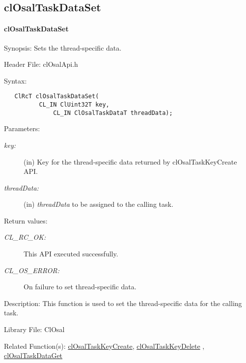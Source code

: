 \subsection{clOsalTaskDataSet}
\hypertarget{pageosal125}{}\paragraph{cl\-Osal\-Task\-Data\-Set}\label{pageosal125}
\begin{Desc}
\item[Synopsis:]Sets the thread-specific data.\end{Desc}
\begin{Desc}
\item[Header File:]clOsalApi.h\end{Desc}
\begin{Desc}
\item[Syntax:]

\footnotesize\begin{verbatim}   ClRcT clOsalTaskDataSet(
          CL_IN ClUint32T key,
              CL_IN ClOsalTaskDataT threadData);
\end{verbatim}
\normalsize
\end{Desc}
\begin{Desc}
\item[Parameters:]
\begin{description}
\item[{\em key:}](in) Key for the thread-specific data returned by cl\-Osal\-Task\-Key\-Create API. \item[{\em thread\-Data:}](in) {\em thread\-Data\/} to be assigned to the calling task.\end{description}
\end{Desc}
\begin{Desc}
\item[Return values:]
\begin{description}
\item[{\em CL\_\-RC\_\-OK:}]This API executed successfully. \item[{\em CL\_\-OS\_\-ERROR:}]On failure to set thread-specific data.\end{description}
\end{Desc}
\begin{Desc}
\item[Description:]This function is used to set the thread-specific data for the calling task.\end{Desc}
\begin{Desc}
\item[Library File:]Cl\-Osal\end{Desc}
\begin{Desc}
\item[Related Function(s):]\hyperlink{pageosal123}{cl\-Osal\-Task\-Key\-Create}, \hyperlink{pageosal124}{cl\-Osal\-Task\-Key\-Delete} , 
\hyperlink{pageosal125}{cl\-Osal\-Task\-Data\-Get} \end{Desc}

